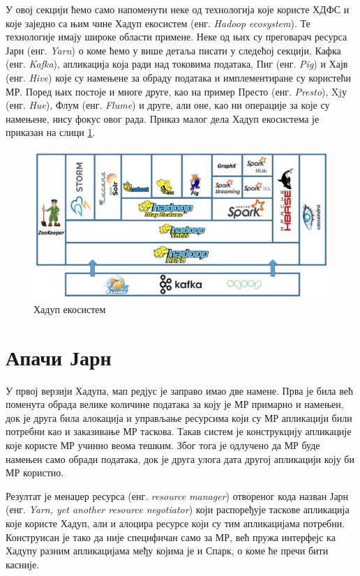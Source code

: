 \documentclass[12pt,oneside]{memoir}
\begin{document}
У овој секцији ћемо само напоменути неке од технологија које користе ХДФС и које заједно са њим чине Хадуп екосистем (енг. \textit{Hadoop ecosystem}). Те технологије имају широке области примене. Неке од њих су преговарач ресурса Јарн (енг. \textit{Yarn}) о коме ћемо у више детаља писати у следећој секцији, Кафка (енг. \textit{Kafka}), апликација која ради над токовима података, Пиг (енг. \textit{Pig}) и Хајв (енг. \textit{Hive}) које су намењене за обраду података и имплементиране су користећи МР. Поред њих постоје и многе друге, као на пример Престо (енг. \textit{Presto}), Xjу (енг. \textit{Hue}), Флум (енг. \textit{Flume}) и друге, али оне, као ни операције за које су намењене, нису фокус овог рада. Приказ малог дела Хадуп екосистема је приказан на слици \ref{fig:hadoop_ecosystem}.


\begin{figure}[!ht]
  \centering
  \includegraphics[width=1\textwidth]{pictures/hadoop_ecosystem.png}
  \caption{Хадуп екосистем}
  \label{fig:hadoop_ecosystem}
\end{figure}


\section{Апачи Јарн}
\label{sec:yarn}

У првој верзији Хадупа, мап редјус је заправо имао две намене. Прва је била већ поменута обрада велике количине података за коју је МР примарно и намењен, док је друга била алокација и управљање ресурсима који су МР апликацији били потребни као и заказивање МР таскова. Такав систем је конструкцију апликације које користе МР учинио веома тешким. Због тога је одлучено да МР буде намењен само обради података, док је друга улога дата другој апликацији коју би МР користио. \cite{hadoop_learning}

Резултат је менаџер ресурса (енг. \textit{resource manager}) отвореног кода назван Јарн (енг. \textit{Yarn, yet another resource negotiator}) који распоређује таскове апликација које користе Хадуп, али и алоцира ресурсе који су тим апликацијама потребни. Конструисан је тако да није специфичан само за МР, већ пружа интерфејс ка Хадупу разним апликацијама међу којима је и Спарк, о коме ће пречи бити касније. \cite{hadoop_learning}
\end{document}
